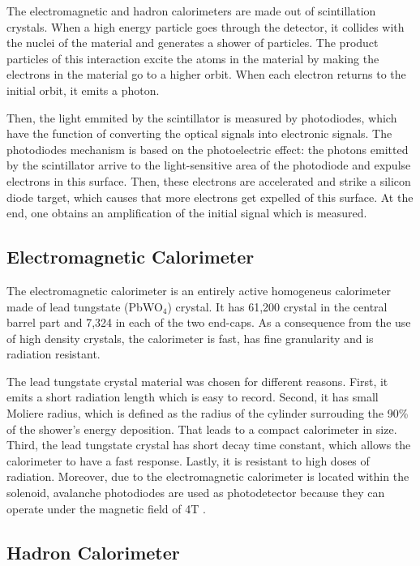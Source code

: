 The electromagnetic and hadron calorimeters are made out of scintillation crystals. When a high energy particle goes through the detector, it collides with the nuclei of the material and generates a shower of particles. The product particles of this interaction excite the atoms in the material by making the electrons in the material go to a higher orbit. When each electron returns to the initial orbit, it emits a photon. 

Then, the light emmited by the scintillator is measured by photodiodes, which have the function of converting the optical signals into electronic signals. The photodiodes mechanism is based on the photoelectric effect: the photons emitted by the scintillator arrive to the light-sensitive area of the photodiode and expulse electrons in this surface. Then, these electrons are accelerated and strike a silicon diode target, which causes that more electrons get expelled of this surface. At the end, one obtains an amplification of the initial signal which is measured.

\subsection{Electromagnetic Calorimeter}

The electromagnetic calorimeter is an entirely active homogeneus calorimeter made of lead tungstate (PbWO$_4$) crystal. It has 61,200 crystal in the central barrel part and 7,324  in each of the two end-caps. As a consequence from the use of high density crystals, the calorimeter is fast, has fine granularity and is radiation resistant. 

The lead tungstate crystal material was chosen for different reasons. First, it emits a short radiation length which is easy to record. Second, it has small Moliere radius, which is defined as the radius of the cylinder surrouding the 90\% of the shower's energy deposition. That leads to a compact calorimeter in size. Third, the lead tungstate crystal has short decay time constant, which allows the calorimeter to have a fast response. Lastly, it is resistant to high doses of radiation. Moreover, due to the electromagnetic calorimeter is located within the solenoid, avalanche photodiodes are used as photodetector because they can operate under the magnetic field of 4T \cite{Perspectives_LHC}. 

\subsection{Hadron Calorimeter}

